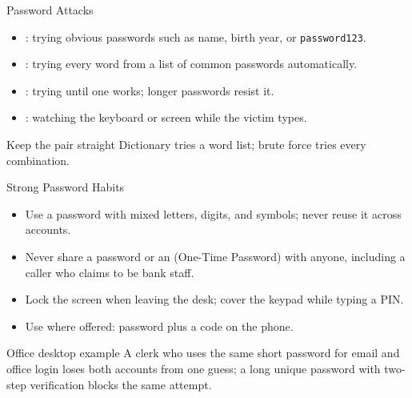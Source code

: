 \documentclass[aspectratio=169]{beamer}
\begin{document}
\begin{frame}{Password Attacks}
  \begin{itemize}
    \item {}: trying obvious passwords such as name, birth
      year, or \texttt{password123}.
    \item {}: trying every word from a list of
      common passwords automatically.
    \item {}: trying  until one works; longer passwords resist it.
    \item {}: watching the keyboard or screen while
      the victim types.
  \end{itemize}
  \begin{block}{Keep the pair straight}
    Dictionary tries a word list; brute force tries every combination.
  \end{block}
\end{frame}

\begin{frame}{Strong Password Habits}
  \begin{itemize}
    \item Use a  password with mixed letters, digits, and
      symbols; never reuse it across accounts.
    \item Never share a password or an  (One-Time Password)
      with anyone, including a caller who claims to be bank staff.
    \item Lock the screen when leaving the desk; cover the keypad while
      typing a PIN.
    \item Use  where offered: password plus a
      code on the phone.
  \end{itemize}
  \begin{exampleblock}{Office desktop example}
    A clerk who uses the same short password for email and office login
    loses both accounts from one guess; a long unique password with
    two-step verification blocks the same attempt.
  \end{exampleblock}
\end{frame}
\end{document}
